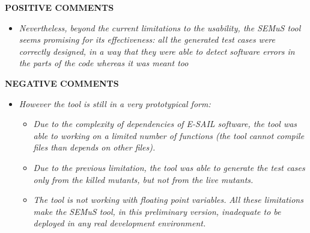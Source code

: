 \textbf{POSITIVE COMMENTS} 
 
\begin{itemize}
\item \emph{Nevertheless, beyond the current limitations to the usability, the SEMuS tool seems promising for its effectiveness: all the generated test cases were correctly designed, in a way that they were able to detect software errors in the parts of the code whereas it was meant too} 
\end{itemize}
 
\textbf{NEGATIVE COMMENTS}
 \begin{itemize}
\item \emph{However the tool is still in a very prototypical form:} 
\begin{itemize}
\item \emph{Due to the complexity of dependencies of E-SAIL software, the tool was able to working on a limited number of functions (the tool cannot compile files than depends on other files).}  
\item \emph{Due to the previous limitation, the tool was able to generate the test cases only from the killed mutants, but not from the live mutants.}  
\item \emph{The tool is not working with floating point variables.}  
\emph{All these limitations make the SEMuS tool, in this preliminary version, inadequate to be deployed in any real development environment. }
\end{itemize}
\end{itemize}
\ENDCHANGEDWPT